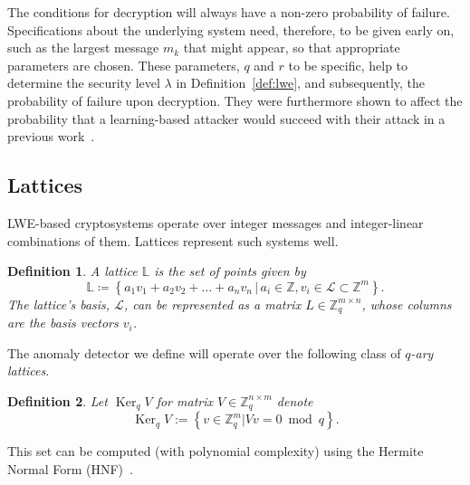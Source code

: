 \documentclass[journal, twoside, web]{ieeecolorpreprint}
\newtheorem{defi}{Definition}
\DeclareMathOperator{\Ker}{Ker}
\begin{document}
The conditions for decryption will always have a non-zero probability of failure. Specifications about the underlying system need, therefore, to be given early on, such as the largest message $m_k$ that might appear, so that appropriate parameters are chosen. These parameters, $q$ and $r$ to be specific, help to determine the security level $\lambda$ in Definition~\ref{def:lwe}, and subsequently, the probability of failure upon decryption. They were furthermore shown to affect the probability that a learning-based attacker would succeed with their attack in a previous work~\cite{alisic2023modelfreelwe}.

\subsection{Lattices}
LWE-based cryptosystems operate over integer messages and integer-linear combinations of them. Lattices represent such systems well.
\begin{defi}
A lattice $\mathbb L$ is the set of points given by
\begin{equation*}
    \mathbb L \coloneqq \left \{ a_1v_1 + a_2v_2 + \ldots + a_nv_n \, \vert \, a_i\in \mathbb Z, v_i \in \mathcal L \subset \mathbb Z^{m} \right \}.
\end{equation*}
The lattice's basis, $\mathcal L$, can be represented as a matrix $L \in \mathbb Z_q^{m \times n}$, whose columns are the basis vectors $v_i$.
\end{defi}
The anomaly detector we define will operate over the following class of \textit{$q$-ary lattices}.
\begin{defi}\label{def:qaryLattice}
    Let $\Ker_q V$ for matrix $V \in \mathbb{Z}_q^{n\times m}$ denote $$ \Ker_q V:= \left \{v \in\mathbb{Z}_q^m \vert Vv = 0 \bmod q\right \}.$$
\end{defi}
This set can be computed (with polynomial complexity) using the Hermite Normal Form (HNF)~\cite{kannan1979}. %
\end{document}
